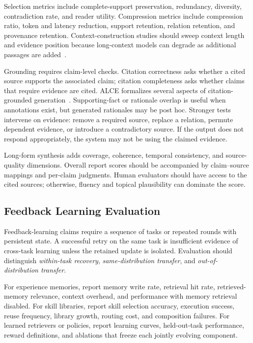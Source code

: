 Selection metrics include complete-support preservation, redundancy, diversity, contradiction rate, and reader utility. Compression metrics include compression ratio, token and latency reduction, support retention, relation retention, and provenance retention. Context-construction studies should sweep context length and evidence position because long-context models can degrade as additional passages are added~\cite{liu2024lostmiddle,jin2025longcontextrag}.

Grounding requires claim-level checks. Citation correctness asks whether a cited source supports the associated claim; citation completeness asks whether claims that require evidence are cited. ALCE formalizes several aspects of citation-grounded generation~\cite{gao2023alce}. Supporting-fact or rationale overlap is useful when annotations exist, but generated rationales may be post hoc. Stronger tests intervene on evidence: remove a required source, replace a relation, permute dependent evidence, or introduce a contradictory source. If the output does not respond appropriately, the system may not be using the claimed evidence.

Long-form synthesis adds coverage, coherence, temporal consistency, and source-quality dimensions. Overall report scores should be accompanied by claim--source mappings and per-claim judgments. Human evaluators should have access to the cited sources; otherwise, fluency and topical plausibility can dominate the score.

\subsection{Feedback Learning Evaluation}
\label{subsec:feedback_evaluation}

Feedback-learning claims require a sequence of tasks or repeated rounds with persistent state. A successful retry on the same task is insufficient evidence of cross-task learning unless the retained update is isolated. Evaluation should distinguish \emph{within-task recovery}, \emph{same-distribution transfer}, and \emph{out-of-distribution transfer}.

For experience memories, report memory write rate, retrieval hit rate, retrieved-memory relevance, context overhead, and performance with memory retrieval disabled. For skill libraries, report skill selection accuracy, execution success, reuse frequency, library growth, routing cost, and composition failures. For learned retrievers or policies, report learning curves, held-out-task performance, reward definitions, and ablations that freeze each jointly evolving component.

